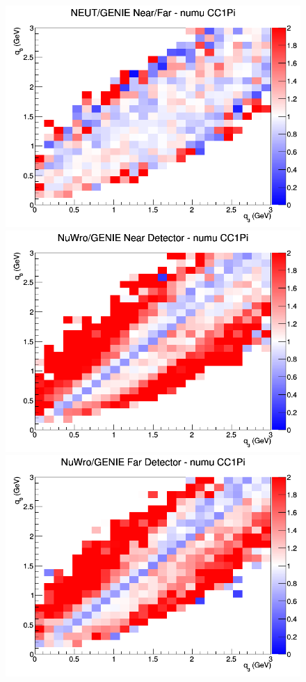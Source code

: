 \documentclass[12pt]{article}
\begin{document}
\begin{figure}[h]
\endminipage
{}
\includegraphics[width=\linewidth]{eff_q0_q3/FGT/ratios/CC1Pi_NEUT_GENIE_numu_NF_q3_q0.png}
\endminipage
\newline
{}
\includegraphics[width=\linewidth]{eff_q0_q3/FGT/ratios/CC1Pi_NuWro_GENIE_numu_near_q3_q0.png}
\endminipage
{}
\includegraphics[width=\linewidth]{eff_q0_q3/FGT/ratios/CC1Pi_NuWro_GENIE_numu_far_q3_q0.png}

\end{figure}
\end{document}
